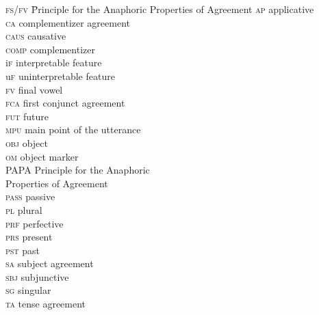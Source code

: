 \documentclass[output=paper
,modfonts
,nonflat
]{langsci/langscibook}
\begin{document}
\begin{multicols}{2}
	\begin{tabbing}
		\textsc{fs/fv}\hspace{5mm} \= Principle for the Anaphoric Properties of Agreement\kill
\textsc{ap} \> applicative \\ 
\textsc{ca} \> complementizer agreement \\ 
\textsc{caus} \> causative \\ 
\textsc{comp} \> complementizer \\
i\textsc{f} \> interpretable feature \\
u\textsc{f} \> uninterpretable feature \\
\textsc{fv} \> final vowel \\ 
\textsc{fca} \> first conjunct agreement \\
\textsc{fut} \> future \\
\textsc{mpu} \>  main point of the utterance \\
\textsc{obj} \> object \\
\textsc{om} \> object marker \\
PAPA \> Principle for the Anaphoric\\ \> Properties of Agreement \\
\textsc{pass} \> passive \\
\textsc{pl} \> plural \\
\textsc{prf} \> perfective \\ 
\textsc{prs} \> present \\ 
\textsc{pst} \> past \\ 
\textsc{sa} \> subject agreement \\ 
\textsc{sbj} \> subjunctive \\
\textsc{sg} \> singular \\
\textsc{ta} \> tense agreement \\
\end{tabbing}
\end{multicols}
\end{document}
